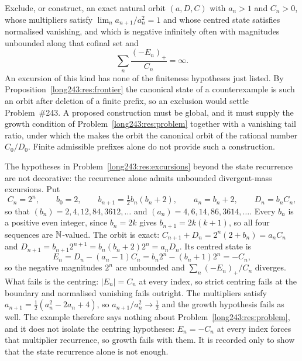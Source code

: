 \documentclass[11pt]{article}
\begin{document}
\begin{problem}\label{long243:res:excursions}
Exclude, or construct, an exact natural orbit $(a,D,C)$ with $a_n>1$ and
$C_n>0$, whose multipliers satisfy $\lim_n a_{n+1}/a_n^{2}=1$ and whose centred
state satisfies normalised vanishing, and which is
negative infinitely often with magnitudes unbounded along that cofinal set and
\[
 \sum_n\frac{(-E_n)_+}{C_n}=\infty .
\]
An excursion of this kind has none of the finiteness hypotheses just listed.
By Proposition~\ref{long243:res:frontier} the canonical state of a counterexample is
such an orbit after deletion of a finite prefix, so an exclusion would settle
Problem~\#243.  A proposed construction must be global, and it must supply the growth
condition of Problem~\ref{long243:res:problem} together with a vanishing tail ratio,
under which the
 makes the orbit the canonical orbit of the rational number
$C_0/D_0$.  Finite admissible prefixes alone do not provide such a
construction.
\end{problem}

\begin{remark}
The hypotheses in Problem~\ref{long243:res:excursions} beyond the state recurrence are
not decorative: the recurrence alone admits unbounded divergent-mass
excursions.  Put
\[
 C_n=2^{n},\qquad b_0=2,\qquad b_{n+1}=\tfrac12 b_n(b_n+2),\qquad
 a_n=b_n+2,\qquad D_n=b_nC_n ,
\]
so that $(b_n)=2,4,12,84,3612,\ldots$ and $(a_n)=4,6,14,86,3614,\ldots$.  Every
$b_n$ is a positive even integer, since $b_n=2k$ gives $b_{n+1}=2k(k+1)$, so all
four sequences are $\mathbb{N}$-valued.  The orbit is exact:
$C_{n+1}+D_n=2^{n}(2+b_n)=a_nC_n$ and
$D_{n+1}=b_{n+1}2^{n+1}=b_n(b_n+2)2^{n}=a_nD_n$.  Its centred state is
\[
 E_n=D_n-(a_n-1)C_n=b_n2^{n}-(b_n+1)2^{n}=-C_n ,
\]
so the negative magnitudes $2^{n}$ are unbounded and $\sum_n(-E_n)_+/C_n$
diverges.  What fails is the centring: $|E_n|=C_n$ at every index, so strict
centring fails at the boundary and normalised vanishing fails outright.  The
multipliers satisfy $a_{n+1}=\tfrac12(a_n^{2}-2a_n+4)$, so
$a_{n+1}/a_n^{2}\to\tfrac12$ and the growth hypothesis fails as well.  The
example therefore says nothing about Problem~\ref{long243:res:problem}, and it does not
isolate the centring hypotheses: $E_n=-C_n$ at every index forces that
multiplier recurrence, so growth fails with them.  It is recorded only to show
that the state recurrence alone is not enough.
\end{remark}
\end{document}
